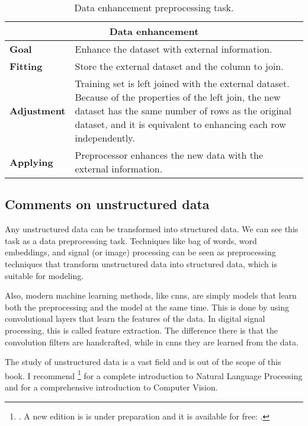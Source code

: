 \begin{table}\caption{Data enhancement preprocessing task.}
  \centering
  \begin{tabular}{lp{6cm}}
    \toprule
    \multicolumn{2}{c}{\textbf{Data enhancement}} \\
    \midrule
    \textbf{Goal} &
      Enhance the dataset with external information. \\
    \textbf{Fitting} &
      Store the external dataset and the column to join. \\
    \textbf{Adjustment} &
      Training set is left joined with the external dataset.  Because of the properties of
      the left join, the new dataset has the same number of rows as the original dataset,
      and it is equivalent to enhancing each row independently.  \\
    \textbf{Applying} &
      Preprocessor enhances the new data with the external information. \\
    \bottomrule
  \end{tabular}
  \label{tab:data-enhancement}
\end{table}

\subsection{Comments on unstructured data}

Any unstructured data can be transformed into structured data.  We can see this task as a
data preprocessing task.  Techniques like bag of words, word embeddings, and signal (or
image) processing can be seen as preprocessing techniques that transform unstructured data
into structured data, which is suitable for modeling.

Also, modern machine learning methods, like \glspl{cnn}, are simply models that learn both
the preprocessing and the model at the same time.  This is done by using convolutional
layers that learn the features of the data.  In digital signal processing, this is called
feature extraction.  The difference there is that the convolution filters are handcrafted,
while in \glspl{cnn} they are learned from the data.

The study of unstructured data is a vast field and is out of the scope of this book.  I
recommend \textcite{Jurafsky2008}\footnote{. A new edition is
is under preparation and it is available for free: .} for a complete
introduction to Natural Language Processing and
\textcite{Szeliski2022} for a comprehensive introduction to
Computer Vision.

